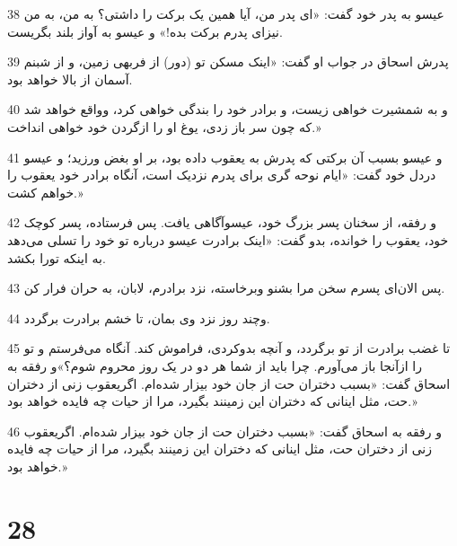 \par 38 عیسو به پدر خود گفت: «ای پدر من، آیا همین یک برکت را داشتی؟ به من، به من نیز‌ای پدرم برکت بده!» و عیسو به آواز بلند بگریست.
\par 39 پدرش اسحاق در جواب او گفت: «اینک مسکن تو (دور) از فربهی زمین، و از شبنم آسمان از بالا خواهد بود.
\par 40 و به شمشیرت خواهی زیست، و برادر خود را بندگی خواهی کرد، وواقع خواهد شد که چون سر باز زدی، یوغ او را ازگردن خود خواهی انداخت.»
\par 41 و عیسو بسبب آن برکتی که پدرش به یعقوب داده بود، بر او بغض ورزید؛ و عیسو دردل خود گفت: «ایام نوحه گری برای پدرم نزدیک است، آنگاه برادر خود یعقوب را خواهم کشت.»
\par 42 و رفقه، از سخنان پسر بزرگ خود، عیسوآگاهی یافت. پس فرستاده، پسر کوچک خود، یعقوب را خوانده، بدو گفت: «اینک برادرت عیسو درباره تو خود را تسلی می‌دهد به اینکه تورا بکشد.
\par 43 پس الان‌ای پسرم سخن مرا بشنو وبرخاسته، نزد برادرم، لابان، به حران فرار کن.
\par 44 وچند روز نزد وی بمان، تا خشم برادرت برگردد.
\par 45 تا غضب برادرت از تو برگردد، و آنچه بدوکردی، فراموش کند. آنگاه می‌فرستم و تو را ازآنجا باز می‌آورم. چرا باید از شما هر دو در یک روز محروم شوم؟»و رفقه به اسحاق گفت: «بسبب دختران حت از جان خود بیزار شده‌ام. اگریعقوب زنی از دختران حت، مثل اینانی که دختران این زمینند بگیرد، مرا از حیات چه فایده خواهد بود.»
\par 46 و رفقه به اسحاق گفت: «بسبب دختران حت از جان خود بیزار شده‌ام. اگریعقوب زنی از دختران حت، مثل اینانی که دختران این زمینند بگیرد، مرا از حیات چه فایده خواهد بود.»
 
\chapter{28}

